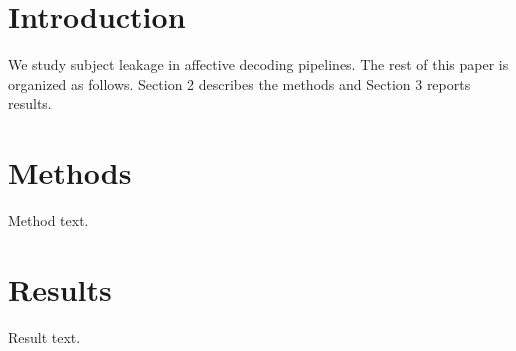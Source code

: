 \documentclass{article}
\begin{document}
\section{Introduction}
We study subject leakage in affective decoding pipelines.
The rest of this paper is organized as follows.
Section 2 describes the methods and Section 3 reports results.
\section{Methods}
Method text.
\section{Results}
Result text.
\end{document}
